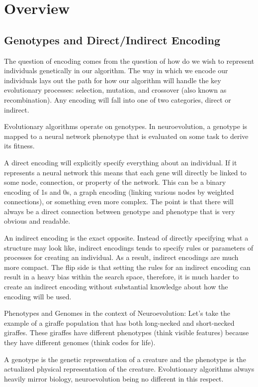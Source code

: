 \documentclass[journal, a4paper]{IEEEtran}
\begin{document}
\section{Overview}

\subsection{Genotypes and Direct/Indirect Encoding}
The question of encoding comes from the question of how do we wish to represent individuals genetically in our algorithm. The way in which we encode our individuals lays out the path for how our algorithm will handle the key evolutionary processes: selection, mutation, and crossover (also known as recombination). Any encoding will fall into one of two categories, direct or indirect.

Evolutionary algorithms operate on genotypes. In neuroevolution, a genotype is mapped to a neural network phenotype that is evaluated on some task to derive its fitness.

A direct encoding will explicitly specify everything about an individual. If it represents a neural network this means that each gene will directly be linked to some node, connection, or property of the network. This can be a binary encoding of 1s and 0s, a graph encoding (linking various nodes by weighted connections), or something even more complex. The point is that there will always be a direct connection between genotype and phenotype that is very obvious and readable. \cite{cite02}

An indirect encoding is the exact opposite. Instead of directly specifying what a structure may look like, indirect encodings tends to specify rules or parameters of processes for creating an individual. As a result, indirect encodings are much more compact. The flip side is that setting the rules for an indirect encoding can result in a heavy bias within the search space, therefore, it is much harder to create an indirect encoding without substantial knowledge about how the encoding will be used. \cite{cite02}

Phenotypes and Genomes in the context of Neuroevolution:
Let's take the example of a giraffe population that has both long-necked and short-necked giraffes. These giraffes have different phenotypes (think visible features) because they have different genomes (think codes for life).

A genotype is the genetic representation of a creature and the phenotype is the actualized physical representation of the creature. Evolutionary algorithms always heavily mirror biology, neuroevolution being no different in this respect.
\end{document}
